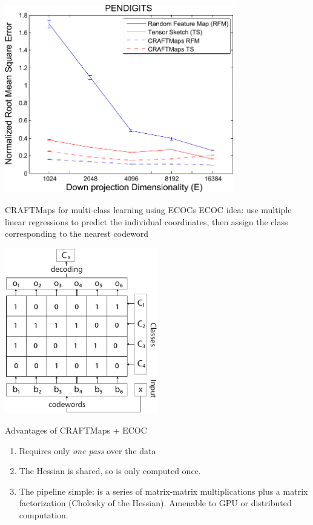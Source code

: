 \documentclass[xcolor=x11names,compress,ignorenonframetext,10pt]{beamer}
\renewcommand{\(}{\begin{columns}}
\renewcommand{\)}{\end{columns}}
\newcommand{\<}[1]{\begin{column}{#1}}
\renewcommand{\>}{\end{column}}
\begin{document}
\begin{frame}
    \begin{center}
      \includegraphics[width=0.75\textwidth]{figures/craftmaps/pendigits}
    \end{center}
\end{frame}
\begin{frame}{CRAFTMaps for multi-class learning using ECOCs}
    ECOC idea: use multiple linear regressions to predict the individual coordinates, then assign the class corresponding to the nearest codeword
    \begin{center}
      \includegraphics[width=0.5\textwidth]{figures/craftmaps/ecoc_illust}
    \end{center}
\end{frame}

\begin{frame}{Advantages of CRAFTMaps + ECOC}
\begin{enumerate}
 \item Requires only \emph{one pass} over the data
 \item The Hessian is shared, so is only computed once.
 \item The pipeline simple: is a series of matrix-matrix multiplications plus a matrix factorization (Cholesky of the Hessian). Amenable to GPU or distributed computation.
\end{enumerate}
\end{frame}
\end{document}
